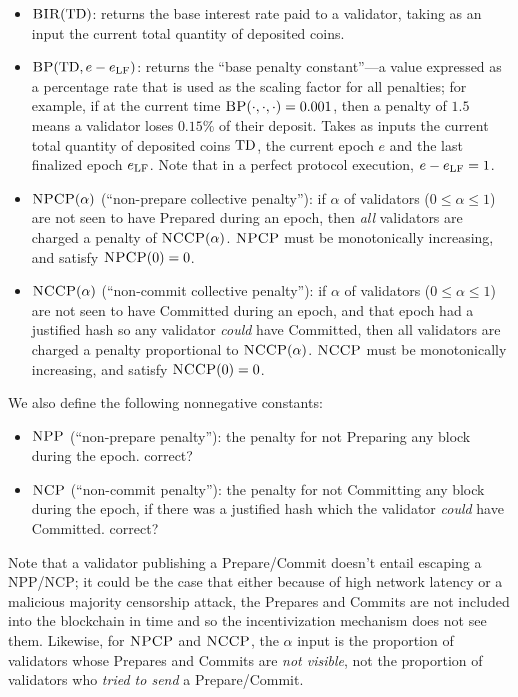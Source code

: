 \documentclass[12pt, final]{article}
\newcommand*{\todo}[1]{\color{red} #1}
\newcommand{\epoch}{\ensuremath{e}\space}
\newcommand{\totaldeposit}{\textnormal{TD}\space}
\newcommand{\epochLF}{\ensuremath{\epoch_{\textnormal{LF}}}\space}
\newcommand{\BIR}{\textsc{BIR}\space}
\newcommand{\BP}{\textsc{BP}\space}
\newcommand{\NCP}{\textsc{NCP}\space}
\newcommand{\NCCP}{\textsc{NCCP}\space}
\newcommand{\NPP}{\textsc{NPP}\space}
\newcommand{\NPCP}{\textsc{NPCP}\space}
\begin{document}
\begin{itemize}
\item $\BIR(\totaldeposit)$: returns the base interest rate paid to a validator, taking as an input the current total quantity of deposited coins.

\item $\BP(\totaldeposit, \epoch - \epochLF )$: returns the ``base penalty constant''---a value expressed as a percentage rate that is used as the scaling factor for all penalties; for example, if at the current time $\BP(\cdot, \cdot, \cdot) = 0.001$, then a penalty of $1.5$ means a validator loses $0.15\%$ of their deposit. Takes as inputs the current total quantity of deposited coins $\totaldeposit$, the current epoch $e$ and the last finalized epoch \epochLF. Note that in a perfect protocol execution, $\epoch - \epochLF = 1$.

\item $\NPCP(\alpha)$ (``non-prepare collective penalty''): if $\alpha$ of validators ($0 \leq \alpha \leq 1$) are not seen to have Prepared during an epoch, then \emph{all} validators are charged a penalty of $\NCCP(\alpha)$. $\NPCP$ must be monotonically increasing, and satisfy $\NPCP(0) = 0$.

\item $\NCCP(\alpha)$ (``non-commit collective penalty''): if $\alpha$ of validators ($0 \leq \alpha \leq 1$) are not seen to have Committed during an epoch, and that epoch had a justified hash so any validator \emph{could} have Committed, then all validators are charged a penalty proportional to $\NCCP(\alpha)$. $\NCCP$ must be monotonically increasing, and satisfy $\NCCP(0) = 0$.
\end{itemize}

We also define the following nonnegative constants:
\begin{itemize}
    \item $\NPP$ (``non-prepare penalty''): the penalty for not Preparing any block during the epoch. \todo{correct?}
    \item $\NCP$ (``non-commit penalty''): the penalty for not Committing any block during the epoch, if there was a justified hash which the validator \emph{could} have Committed. \todo{correct?}
\end{itemize}


Note that a validator publishing a Prepare/Commit doesn't entail escaping a \NPP/\NCP; it could be the case that either because of high network latency or a malicious majority censorship attack, the Prepares and Commits are not included into the blockchain in time and so the incentivization mechanism does not see them. Likewise, for $\NPCP$ and $\NCCP$, the $\alpha$ input is the proportion of validators whose Prepares and Commits are \emph{not visible}, not the proportion of validators who \emph{tried to send} a Prepare/Commit. 
\end{document}
